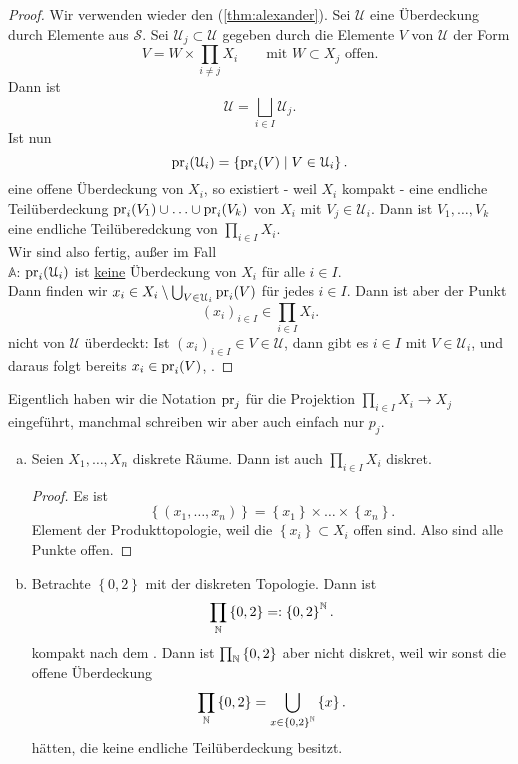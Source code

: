 \begin{proof}
    Wir verwenden wieder den  (\autoref{thm:alexander}). Sei $\mathcal{U}$ eine Überdeckung durch Elemente aus  $\mathcal{S}$. Sei $\mathcal{U}_j \subset \mathcal{U}$ gegeben durch die Elemente $V$ von  $\mathcal{U}$ der Form
    \[
    V = W \times \prod_{i\neq j} X_i \qquad \text{mit } W\subset X_j \text{ offen}
    .\] 
    Dann ist
    \[
    \mathcal{U} = \bigsqcup_{i \in  I} \mathcal{U}_j
    .\] 
    Ist nun
    \[
        \operatorname{pr}_i (\mathcal{U}_i)  = \left \{\operatorname{pr}_i(V) \mid  V\in \mathcal{U}_i\right\} 
    .\] 
    eine offene Überdeckung von $X_i$, so existiert - weil  $X_i$ kompakt - eine endliche Teilüberdeckung  $\operatorname{pr}_i(V_1)\cup \ldots\cup \operatorname{pr}_i(V_k)$ von $X_i$ mit  $V_j \in \mathcal{U}_i$. Dann ist $V_1,\ldots,V_k$ eine endliche Teilüberedckung von $\prod_{i \in I} X_i$. \\
    Wir sind also fertig, außer im Fall \\
    $\mathbb{A}$: $\operatorname{pr}_i(\mathcal{U}_i)$ ist  \underline{keine} Überdeckung von $X_i$ für alle  $i\in I$.  \\
    Dann finden wir $x_i \in X_i \setminus \bigcup_{V\in \mathcal{U}_i} \operatorname{pr}_i(V)$ für jedes $i\in I$. Dann ist aber der Punkt
    \[
        (x_i)_{i \in I}\in \prod_{i \in I}X_i
    .\] 
    nicht von $\mathcal{U}$ überdeckt: Ist $(x_i)_{i \in I} \in V\in \mathcal{U}$, dann gibt es $i\in I$ mit $V\in \mathcal{U}_i$, und daraus folgt bereits $x_i \in \operatorname{pr}_i(V)$, \contra.
\end{proof}
\begin{remark}
    Eigentlich haben wir die Notation $\operatorname{pr}_j$ für die Projektion  $\prod _{i \in I}X_i \to  X_j$ eingeführt, manchmal schreiben wir aber auch einfach nur $p_j$.
\end{remark}
\begin{example}
    \begin{enumerate}[a)]
        \item Seien $X_1,\ldots,X_n$ diskrete Räume. Dann ist auch $\prod_{i \in I}X_i$ diskret.
            \begin{proof}
                Es ist
                \[
                    \left \{(x_1,\ldots,x_n)\right\}  = \left \{x_1\right\} \times \ldots\times \left \{x_n\right\} 
                .\] 
                Element der Produkttopologie, weil die $\left \{x_i\right\} \subset X_i$ offen sind. Also sind alle Punkte offen.
            \end{proof}
        \item Betrachte $\left \{0,2\right\} $ mit der diskreten Topologie. Dann ist
            \[
            \prod_{\mathbb{N}} \left \{0,2\right\} =: \left \{0,2\right\} ^{\mathbb{N}}
            .\] 
            kompakt nach dem . Dann ist $\prod_{\mathbb{N}} \left \{0,2\right\} $ aber nicht diskret, weil wir sonst die offene Überdeckung
            \[
            \prod_{\mathbb{N}} \left \{0,2\right\} = \bigcup_{x\in \left \{0,2\right\} ^{\mathbb{N}}}  \left \{x\right\} 
            .\] 
            hätten, die keine endliche Teilüberdeckung besitzt.
    \end{enumerate}
\end{example}

